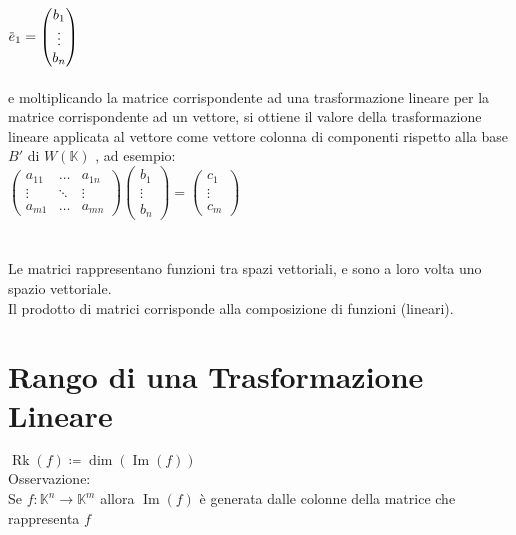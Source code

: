 \documentclass[a4paper, twoside, italian, 11pt]{book}
\newcommand{\overbar}[1] {\mkern 1.5mu\overline{\mkern-1.5mu#1\mkern-1.5mu}\mkern 1.5mu}
\DeclareMathOperator{\Ima}{Im}
\DeclareMathOperator{\Rk}{Rk}
\newcommand{\K}{\mathbb K}
\begin{document}
$\overbar e_1 =
\begin{pmatrix}
b_1 \\
\vdots \\
b_n
\end{pmatrix}$ \\\\

\noindent
e moltiplicando la matrice corrispondente ad una trasformazione lineare per la matrice corrispondente ad un vettore, si ottiene il valore della trasformazione lineare applicata al vettore come vettore colonna di componenti rispetto alla base $B'$ di $W(\K)$ , ad esempio: \\

$\begin{pmatrix}
a_{11} & \dots & a_{1n} \\
\vdots & \ddots & \vdots \\
a_{m1} & \dots & a_{mn}
\end{pmatrix}
\begin{pmatrix}
b_1 \\
\vdots \\
b_n
\end{pmatrix} = 
\begin{pmatrix}
c_1 \\
\vdots \\
c_m
\end{pmatrix}
$ \\\\\\

\noindent
Le matrici rappresentano funzioni tra spazi vettoriali, e sono a loro volta uno spazio vettoriale.\\

\noindent
Il prodotto di matrici corrisponde alla composizione di funzioni (lineari).



\section{Rango di una Trasformazione Lineare}

$\Rk(f) \coloneqq \dim(\Ima(f))$ \\

\noindent
Osservazione: \\

\noindent
Se $f : \K^n \rightarrow \K^m$ allora $\Ima(f)$ è generata dalle colonne della matrice che rappresenta $f$ \\
\end{document}
